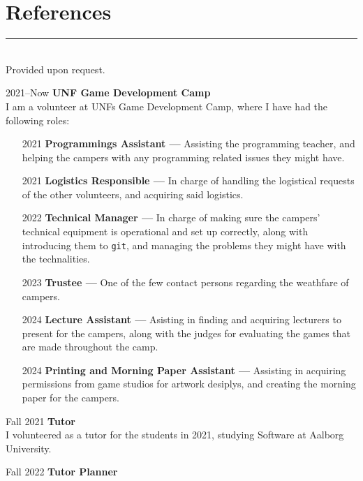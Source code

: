 \section*{References}
\hrule width5cm \ \\
Provided upon request.

\fi
\iffalse
\vspace{1em}
\newbox\vsep
\setbox\vsep\hbox{\vrule height 2ex depth 16ex width 1pt}
\dp{}
\newcommand\showsep{\leavevmode\llap{\copy\vsep}}
\begin{cv}
\item[2021--Now] \textbf{UNF Game Development Camp}\\
    I am a volunteer at UNFs Game Development Camp, where I have had the following roles:
    \begin{itemize}[leftmargin=4em]
        \item[2021] \textbf{Programmings Assistant ---} Assisting the programming teacher, and
            helping the campers with any programming related issues they might have.
        \item[2021] \textbf{Logistics Responsible ---} In charge of handling the logistical
            requests of the other volunteers, and acquiring said logistics.
        \item[2022] \textbf{Technical Manager ---} In charge of making sure the campers'
            technical equipment is operational and set up correctly,
            along with introducing them to \texttt{git}, and managing
            the problems they might have with the technalities.
        \item[2023] \textbf{Trustee ---} One of the few contact persons regarding the weathfare of campers.
        \item[2024] \textbf{Lecture Assistant ---} Asisting in finding and acquiring lecturers to present for the campers, along with the judges for evaluating the games that are made throughout the camp.
        \item[2024] \textbf{Printing and Morning Paper Assistant ---} Assisting in acquiring permissions from game studios for artwork desiplys, and creating the morning paper for the campers.
    \end{itemize}
\item[Fall 2021]  \textbf{Tutor}\\
    I volunteered as a tutor for the students in 2021, studying Software at Aalborg University.
\item[Fall 2022] \textbf{Tutor Planner}\\

\end{cv}

